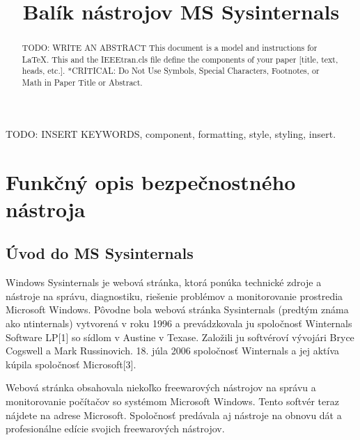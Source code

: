 \documentclass[conference]{IEEEtran}
\begin{document}
\title{Balík nástrojov MS Sysinternals}

\author{
}

\maketitle

\begin{abstract}
TODO: WRITE AN ABSTRACT
This document is a model and instructions for \LaTeX.
This and the IEEEtran.cls file define the components of your paper [title, text, heads, etc.]. *CRITICAL: Do Not Use Symbols, Special Characters, Footnotes, 
or Math in Paper Title or Abstract.
\end{abstract}

\begin{IEEEkeywords}
TODO: INSERT KEYWORDS, component, formatting, style, styling, insert.
\end{IEEEkeywords}

\section{Funkčný opis bezpečnostného nástroja}
\subsection{Úvod do MS Sysinternals}

Windows Sysinternals je webová stránka, ktorá ponúka technické zdroje a nástroje na správu, diagnostiku, riešenie problémov a monitorovanie prostredia Microsoft Windows. Pôvodne bola webová stránka Sysinternals (predtým známa ako ntinternals) vytvorená v roku 1996 a prevádzkovala ju spoločnosť Winternals Software LP[1] so sídlom v Austine v Texase. Založili ju softvéroví vývojári Bryce Cogswell a Mark Russinovich. 18. júla 2006 spoločnosť Winternals a jej aktíva kúpila spoločnosť Microsoft[3].

Webová stránka obsahovala niekoľko freewarových nástrojov na správu a monitorovanie počítačov so systémom Microsoft Windows. Tento softvér teraz nájdete na adrese Microsoft. Spoločnosť predávala aj nástroje na obnovu dát a profesionálne edície svojich freewarových nástrojov.
\end{document}
